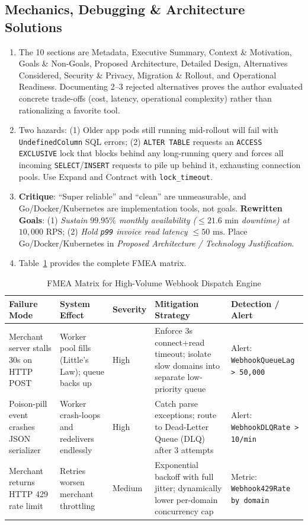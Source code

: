 \subsection*{Mechanics, Debugging \& Architecture Solutions}
\begin{enumerate}[label=\textbf{Solution~\thechapter.\arabic*}, leftmargin=*]
  \item The 10 sections are Metadata, Executive Summary, Context \& Motivation, Goals \& Non-Goals, Proposed Architecture, Detailed Design, Alternatives Considered, Security \& Privacy, Migration \& Rollout, and Operational Readiness. Documenting 2--3 rejected alternatives proves the author evaluated concrete trade-offs (cost, latency, operational complexity) rather than rationalizing a favorite tool.
  \item Two hazards: (1) Older app pods still running mid-rollout will fail with \texttt{UndefinedColumn} SQL errors; (2) \texttt{ALTER TABLE} requests an \texttt{ACCESS EXCLUSIVE} lock that blocks behind any long-running query and forces all incoming \texttt{SELECT}/\texttt{INSERT} requests to pile up behind it, exhausting connection pools. Use Expand and Contract with \texttt{lock\_timeout}.
  \item \textbf{Critique}: ``Super reliable'' and ``clean'' are unmeasurable, and Go/Docker/Kubernetes are implementation tools, not goals. \textbf{Rewritten Goals}: (1) \textit{Sustain $99.95\%$ monthly availability ($\le 21.6\text{ min}$ downtime) at $10,000\text{ RPS}$}; (2) \textit{Hold \texttt{p99} invoice read latency $\le 50\text{ ms}$}. Place Go/Docker/Kubernetes in \emph{Proposed Architecture / Technology Justification}.
  \item Table~\ref{tab:v5-ch07-webhook-fmea} provides the complete FMEA matrix.
\end{enumerate}

\begin{table}[htbp]
\centering\scriptsize
\begin{tabular}{p{2.6cm}p{2.7cm}p{1.2cm}p{3.2cm}p{2.8cm}}
\toprule
\textbf{Failure Mode} & \textbf{System Effect} & \textbf{Severity} & \textbf{Mitigation Strategy} & \textbf{Detection / Alert} \\
\midrule
Merchant server stalls 30s on HTTP POST & Worker pool fills (Little's Law); queue backs up & High & Enforce 3s connect+read timeout; isolate slow domains into separate low-priority queue & Alert: \texttt{WebhookQueueLag > 50,000} \\
Poison-pill event crashes JSON serializer & Worker crash-loops and redelivers endlessly & High & Catch parse exceptions; route to Dead-Letter Queue (DLQ) after 3 attempts & Alert: \texttt{WebhookDLQRate > 10/min} \\
Merchant returns HTTP 429 rate limit & Retries worsen merchant throttling & Medium & Exponential backoff with full jitter; dynamically lower per-domain concurrency cap & Metric: \texttt{Webhook429Rate by domain} \\
\bottomrule
\end{tabular}
\caption{FMEA Matrix for High-Volume Webhook Dispatch Engine}
\label{tab:v5-ch07-webhook-fmea}
\end{table}

